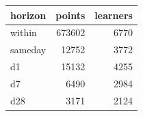 \begin{tabular}{lrr}
\toprule
horizon & points & learners \\
\midrule
within & 673602 & 6770 \\
sameday & 12752 & 3772 \\
d1 & 15132 & 4255 \\
d7 & 6490 & 2984 \\
d28 & 3171 & 2124 \\
\bottomrule
\end{tabular}
